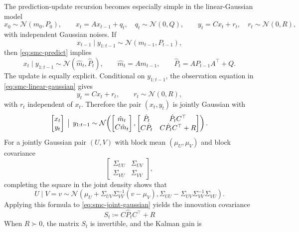 The prediction-update recursion becomes especially simple in the linear-Gaussian model
\begin{equation}
  x_0 \sim \mathcal{N}(m_0,P_0),
  \qquad
  x_t = A x_{t-1} + q_t,
  \quad q_t \sim \mathcal{N}(0,Q),
  \qquad
  y_t = C x_t + r_t,
  \quad r_t \sim \mathcal{N}(0,R),
  \label{eq:smc-linear-gaussian}
\end{equation}
with independent Gaussian noises.
If
\[
  x_{t-1} \mid y_{1:t-1} \sim \mathcal{N}(m_{t-1},P_{t-1}),
\]
then \eqref{eq:smc-predict} implies
\begin{equation}
  x_t \mid y_{1:t-1} \sim \mathcal{N}(\hat m_t,\hat P_t),
  \qquad
  \hat m_t = A m_{t-1},
  \qquad
  \hat P_t = A P_{t-1} A^\top + Q.
  \label{eq:smc-kalman-predict}
\end{equation}
The update is equally explicit.
Conditional on $y_{1:t-1}$, the observation equation in \eqref{eq:smc-linear-gaussian} gives
\[
  y_t = Cx_t + r_t,
  \qquad
  r_t \sim \mathcal{N}(0,R),
\]
with $r_t$ independent of $x_t$.
Therefore the pair $(x_t,y_t)$ is jointly Gaussian with
\begin{equation}
  \begin{bmatrix}
    x_t \\
    y_t
  \end{bmatrix}
  \,\bigm|\,
  y_{1:t-1}
  \sim
  \mathcal{N}\!\left(
    \begin{bmatrix}
      \hat m_t \\
      C\hat m_t
    \end{bmatrix},
    \begin{bmatrix}
      \hat P_t & \hat P_t C^\top \\
      C\hat P_t & C\hat P_t C^\top + R
    \end{bmatrix}
  \right).
  \label{eq:smc-joint-gaussian}
\end{equation}
For a jointly Gaussian pair $(U,V)$ with block mean $(\mu_U,\mu_V)$ and block covariance
\[
  \begin{bmatrix}
    \Sigma_{UU} & \Sigma_{UV} \\
    \Sigma_{VU} & \Sigma_{VV}
  \end{bmatrix},
\]
completing the square in the joint density shows that
\[
  U \mid V=v
  \sim
  \mathcal{N}\!\left(
    \mu_U + \Sigma_{UV}\Sigma_{VV}^{-1}(v-\mu_V),
    \Sigma_{UU} - \Sigma_{UV}\Sigma_{VV}^{-1}\Sigma_{VU}
  \right).
\]
Applying this formula to \eqref{eq:smc-joint-gaussian} yields the innovation covariance
\[
  S_t \coloneqq C\hat P_t C^\top + R
\]
When $R \succ 0$, the matrix $S_t$ is invertible, and the Kalman gain is
